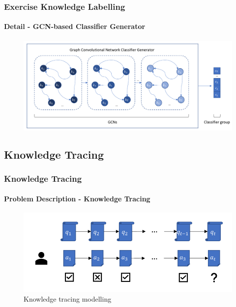 \documentclass{beamer}
\begin{document}
\begin{frame}
  \frametitle{Exercise Knowledge Labelling}
  \framesubtitle{Detail - GCN-based Classifier Generator}
  \begin{figure}
    \centering
    \includegraphics[width=1.0\textwidth]{figures/ch2-gcnclsgen-model.pdf}
  \end{figure}
\end{frame}

\subsection{Knowledge Tracing}

\begin{frame}
  \frametitle{Knowledge Tracing}
  \framesubtitle{Problem Description - Knowledge Tracing}
  \begin{figure}
    \centering
    \includegraphics[width=1.0\textwidth]{figures/ch3-model-ktdes.pdf}
    \caption{Knowledge tracing modelling}
  \end{figure}
\end{frame}
\end{document}
